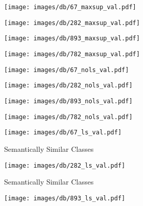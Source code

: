 \begin{figure*}[ht]
\captionsetup{font=footnotesize,labelfont=footnotesize}
    \centering
    \begin{subfigure}[b]{0.245\textwidth}
        \texttt{[image: images/db/67\_maxsup\_val.pdf]}
    \end{subfigure}
    \begin{subfigure}[b]{0.245\textwidth}
        \texttt{[image: images/db/282\_maxsup\_val.pdf]}
    \end{subfigure}
    \begin{subfigure}[b]{0.245\textwidth}
        \texttt{[image: images/db/893\_maxsup\_val.pdf]}
    \end{subfigure}
    \begin{subfigure}[b]{0.245\textwidth}
        \texttt{[image: images/db/782\_maxsup\_val.pdf]}
    \end{subfigure}
    \centering
    \begin{subfigure}[b]{0.245\textwidth}
        \texttt{[image: images/db/67\_nols\_val.pdf]}
    \end{subfigure}
    \begin{subfigure}[b]{0.245\textwidth}
        \texttt{[image: images/db/282\_nols\_val.pdf]}
    \end{subfigure}
    \begin{subfigure}[b]{0.245\textwidth}
        \texttt{[image: images/db/893\_nols\_val.pdf]}
    \end{subfigure}
    \begin{subfigure}[b]{0.245\textwidth}
        \texttt{[image: images/db/782\_nols\_val.pdf]}
    \end{subfigure}
    \begin{subfigure}[b]{0.245\textwidth}    \texttt{[image: images/db/67\_ls\_val.pdf]}
        \caption{Semantically Similar Classes}
        \label{bd_a}
    \end{subfigure}
    \begin{subfigure}[b]{0.245\textwidth}     \texttt{[image: images/db/282\_ls\_val.pdf]}
        \caption{Semantically Similar Classes}
        \label{bd_b}
    \end{subfigure}
    \begin{subfigure}[b]{0.245\textwidth}     \texttt{[image: images/db/893\_ls\_val.pdf]}

\end{subfigure}
\end{figure*}
